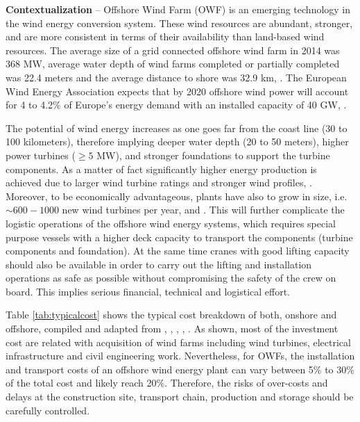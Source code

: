 \textbf{Contextualization} --
Offshore Wind Farm (OWF) is an emerging technology in the wind energy conversion system. These wind resources are abundant, stronger, and are more consistent in terms of their availability than land-based wind resources. The average size of a grid connected offshore wind farm in 2014 was 368 MW, average water depth of wind farms completed or partially completed was 22.4 meters and the average distance to shore was 32.9 km, \cite{Giorgio2015}. The European Wind Energy Association expects that by 2020 offshore wind power will account for 4 to 4.2\% of Europe's energy demand with an installed capacity of 40 GW, \cite{EWEA2011, Kaldellis2013}.

The potential of wind energy increases as one goes far from the coast line (30 to 100 kilometers), therefore implying deeper water depth (20 to 50 meters), higher power turbines ($\geq 5$ MW), and stronger foundations to support the turbine components. As a matter of fact significantly higher energy production is achieved due to larger wind turbine ratings and stronger wind profiles, \cite{Sun2012298}. Moreover, to be economically advantageous, plants have also to grow in size, i.e. $\sim600-1000$ new wind turbines per year, \cite{EWEA2011} and \cite{Kaldellis2013}. This will further complicate the logistic operations of the offshore wind energy systems, which requires special purpose vessels with a higher deck capacity to transport the components (turbine components and foundation). At the same time cranes with good lifting capacity should also be available in order to carry out the lifting and installation operations as safe as possible without compromising the safety of the crew on board. This implies serious financial, technical and logistical effort.

Table \ref{tab:typicalcost} shows the typical cost breakdown of both, onshore and offshore, compiled and adapted from \cite{Henderson2003}, \cite{Junginger2004}, \cite{UK10}, \cite{TCE12}, \cite{IRENA12}. As shown, most of the investment cost are related with acquisition of wind farms including wind turbines, electrical infrastructure and civil engineering work. Nevertheless, for OWFs, the installation and transport costs of an offshore wind energy plant can vary between 5\% to 30\% of the total cost and likely reach 20\%. Therefore, the risks of over-costs and delays at the construction site, transport chain, production and storage should be carefully controlled.
